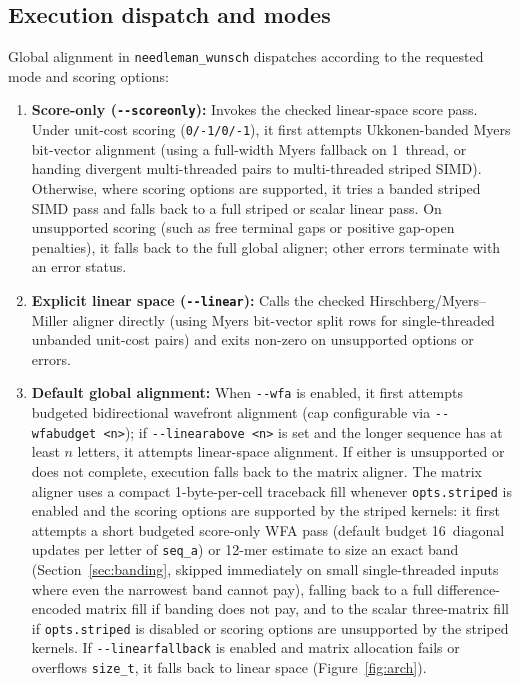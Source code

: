 \documentclass[11pt,a4paper]{article}
\begin{document}
\subsection{Execution dispatch and modes}

Global alignment in \texttt{needleman\_wunsch} dispatches according to the requested mode and scoring options:
\begin{enumerate}
  \item \textbf{Score-only (\texttt{-{}-scoreonly}):} Invokes the checked linear-space score pass. Under unit-cost scoring (\texttt{0/-1/0/-1}), it first attempts Ukkonen-banded Myers bit-vector alignment \citep{myers1999fast,ukkonen1985algorithms} (using a full-width Myers fallback on 1~thread, or handing divergent multi-threaded pairs to multi-threaded striped SIMD). Otherwise, where scoring options are supported, it tries a banded striped SIMD pass and falls back to a full striped or scalar linear pass. On unsupported scoring (such as free terminal gaps or positive gap-open penalties), it falls back to the full global aligner; other errors terminate with an error status.
  \item \textbf{Explicit linear space (\texttt{-{}-linear}):} Calls the checked Hirschberg/Myers--Miller aligner directly (using Myers bit-vector split rows for single-threaded unbanded unit-cost pairs) and exits non-zero on unsupported options or errors.
  \item \textbf{Default global alignment:} When \texttt{-{}-wfa} is enabled, it first attempts budgeted bidirectional wavefront alignment (cap configurable via \texttt{-{}-wfabudget <n>}); if \texttt{-{}-linearabove <n>} is set and the longer sequence has at least $n$ letters, it attempts linear-space alignment. If either is unsupported or does not complete, execution falls back to the matrix aligner. The matrix aligner uses a compact 1-byte-per-cell traceback fill whenever \texttt{opts.striped} is enabled and the scoring options are supported by the striped kernels: it first attempts a short budgeted score-only WFA pass (default budget 16~diagonal updates per letter of \texttt{seq\_a}) or 12-mer estimate to size an exact band (Section~\ref{sec:banding}, skipped immediately on small single-threaded inputs where even the narrowest band cannot pay), falling back to a full difference-encoded matrix fill if banding does not pay, and to the scalar three-matrix fill if \texttt{opts.striped} is disabled or scoring options are unsupported by the striped kernels. If \texttt{-{}-linearfallback} is enabled and matrix allocation fails or overflows \texttt{size\_t}, it falls back to linear space (Figure~\ref{fig:arch}).
\end{enumerate}
\end{document}
